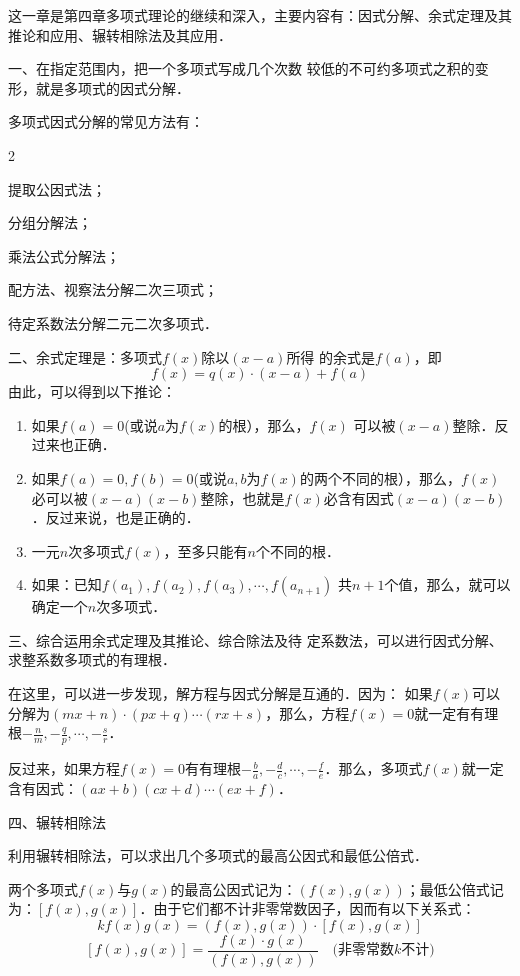 这一章是第四章多项式理论的继续和深入，主要内容有：因式分解、余式定理及其推论和应用、辗转相除法及其应用．

一、在指定范围内，把一个多项式写成几个次数
较低的不可约多项式之积的变形，就是多项式的因式分解．

多项式因式分解的常见方法有：
\begin{enumerate}
    \begin{multicols}{2}
    \item 提取公因式法；
    \item 分组分解法；
    \item 乘法公式分解法；
    \item 配方法、视察法分解二次三项式；
    \item 待定系数法分解二元二次多项式．
    \end{multicols}
\end{enumerate} 

二、余式定理是：多项式$f(x)$除以$(x-a)$所得
的余式是$f(a)$，即
\[f (x) =q (x) \cdot (x-a) +f (a) \]
由此，可以得到以下推论：
\begin{enumerate}
\item 如果$f(a)=0$(或说$a$为$f(x)$的根），那么，$f(x)$
可以被$(x-a)$整除．反过来也正确．
\item 如果$f(a)=0,f(b)=0$(或说$a,b$为$f(x)$的两个不同的根），那么，$f(x)$必可以被$(x-a)(x-b)$整除，也就是$f(x)$必含有因式$(x-a)(x-b)$．反过来说，也是正确的．
\item 一元$n$次多项式$f(x)$，至多只能有$n$个不同的根．
\item  如果：已知$f(a_1),f(a_2),f(a_3),\cdots,f(a_{n+1})$
共$n+1$个值，那么，就可以确定一个$n$次多项式．
\end{enumerate}

三、综合运用余式定理及其推论、综合除法及待
定系数法，可以进行因式分解、求整系数多项式的有理根．

在这里，可以进一步发现，解方程与因式分解是互通的．因为：
如果$f(x)$可以分解为$(mx+n)\cdot (px+q)\cdots (rx+s)$，那么，方程$f(x)=0$就一定有有理根$-\frac{n}{m},-\frac{q}{p},\cdots,-\frac{s}{r}$．

反过来，如果方程$f(x)=0$有有理根$-\frac{b}{a},-\frac{d}{c},\cdots,-\frac{f}{e}$．那么，多项式$f(x)$就一定含有因式：$(ax+b)(cx+d)\cdots(ex+f)$．

四、辗转相除法

利用辗转相除法，可以求出几个多项式的最高公因式和最低公倍式．

两个多项式$f(x)$与$g(x)$的最高公因式记为：$(f(x),g(x))$；最低公倍式记为：$[f(x), g(x)]$．由于它们都不计非零常数因子，因而有以下关系式：
\[ kf (x) g (x) = (f(x), g(x))\cdot [f(x),g(x)]\]
\[[f(x),g(x)]=\frac{f(x)\cdot g(x)}{(f(x), g(x))}\quad \text{(非零常数$k$不计)}\]



